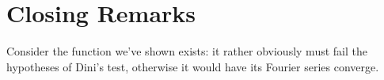 \documentclass{amsart}
\theoremstyle{definition}
\begin{document}
\section{Closing Remarks}

Consider the function we've shown exists: it rather obviously must fail the hypotheses of Dini's test, otherwise it would have its Fourier series converge. 
\end{document}
